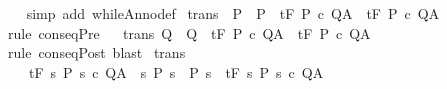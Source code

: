 \begin{isabellebody}
%
\isadelimproof
\ \ %
\endisadelimproof
%
\isatagproof
{}\isamarkupfalse%
\ {\isacharparenleft}simp\ add{\isacharcolon}\ whileAnno{\isacharunderscore}def{\isacharparenright}%
\endisatagproof
{\isafoldproof}%
%
\isadelimproof
\isanewline
%
\endisadelimproof
\isanewline
{}\isamarkupfalse%
\ {\isacharbrackleft}trans{\isacharbrackright}\ {\isacharcolon}\ {\isachardoublequoteopen}P{\isacharprime}\ {\isasymsubseteq}\ P\ {\isasymLongrightarrow}\ {\isasymGamma}{\isacharcomma}{\isasymTheta}{\isasymturnstile}\isactrlsub t\isactrlbsub {\isacharslash}F\isactrlesub \ P\ c\ Q{\isacharcomma}A\ {\isasymLongrightarrow}\ {\isasymGamma}{\isacharcomma}{\isasymTheta}{\isasymturnstile}\isactrlsub t\isactrlbsub {\isacharslash}F\isactrlesub \ P{\isacharprime}\ c\ Q{\isacharcomma}A{\isachardoublequoteclose}\isanewline
%
\isadelimproof
\ \ %
\endisadelimproof
%
\isatagproof
{}\isamarkupfalse%
\ {\isacharparenleft}rule\ conseqPre{\isacharparenright}%
\endisatagproof
{\isafoldproof}%
%
\isadelimproof
\isanewline
%
\endisadelimproof
\ \isanewline
{}\isamarkupfalse%
\ {\isacharbrackleft}trans{\isacharbrackright}{\isacharcolon}\ {\isachardoublequoteopen}Q\ {\isasymsubseteq}\ Q{\isacharprime}\ {\isasymLongrightarrow}\ {\isasymGamma}{\isacharcomma}{\isasymTheta}{\isasymturnstile}\isactrlsub t\isactrlbsub {\isacharslash}F\isactrlesub \ P\ c\ Q{\isacharcomma}A\ {\isasymLongrightarrow}\ {\isasymGamma}{\isacharcomma}{\isasymTheta}{\isasymturnstile}\isactrlsub t\isactrlbsub {\isacharslash}F\isactrlesub \ P\ c\ Q{\isacharprime}{\isacharcomma}A{\isachardoublequoteclose}\isanewline
%
\isadelimproof
\ \ %
\endisadelimproof
%
\isatagproof
{}\isamarkupfalse%
\ {\isacharparenleft}rule\ conseqPost{\isacharparenright}\ blast{\isacharplus}%
\endisatagproof
{\isafoldproof}%
%
\isadelimproof
\isanewline
%
\endisadelimproof
\isanewline
{}\isamarkupfalse%
\ {\isacharbrackleft}trans{\isacharbrackright}{\isacharcolon}\isanewline
\ \ \ \ {\isachardoublequoteopen}{\isasymGamma}{\isacharcomma}{\isasymTheta}{\isasymturnstile}\isactrlsub t\isactrlbsub {\isacharslash}F\isactrlesub \ {\isacharbraceleft}s{\isachardot}\ P\ s{\isacharbraceright}\ c\ Q{\isacharcomma}A\ {\isasymLongrightarrow}\ {\isacharparenleft}{\isasymAnd}s{\isachardot}\ P{\isacharprime}\ s\ {\isasymlongrightarrow}\ P\ s{\isacharparenright}\ {\isasymLongrightarrow}\ {\isasymGamma}{\isacharcomma}{\isasymTheta}{\isasymturnstile}\isactrlsub t\isactrlbsub {\isacharslash}F\isactrlesub \ {\isacharbraceleft}s{\isachardot}\ P{\isacharprime}\ s{\isacharbraceright}\ c\ Q{\isacharcomma}A{\isachardoublequoteclose}\isanewline

\end{isabellebody}
